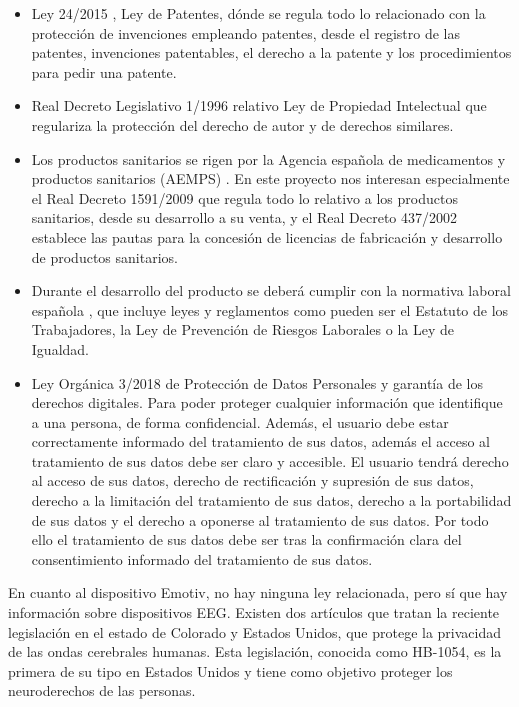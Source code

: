 \begin{itemize}
    \item Ley 24/2015 \cite{LeyPatentes}, Ley de Patentes, dónde se regula todo lo relacionado con la protección de invenciones empleando patentes, desde el registro de las patentes, invenciones patentables, el derecho a la patente y los procedimientos para pedir una patente.
    \item Real Decreto Legislativo 1/1996 \cite{LeyPropiedadIntelectual} relativo Ley de Propiedad Intelectual que regulariza la protección del derecho de autor y de derechos similares.
    \item Los productos sanitarios se rigen por la Agencia española de medicamentos y productos sanitarios (AEMPS) \cite{LegislacionProductosSanitarios}. En este proyecto nos interesan especialmente el Real Decreto 1591/2009 \cite{LeyProductosSanitarios} que regula todo lo relativo a los productos sanitarios, desde su desarrollo a su venta, y el Real Decreto 437/2002\cite{LeyLicenciasFuncionamiento} establece las pautas para la concesión de licencias de fabricación y desarrollo de productos sanitarios.
    \item Durante el desarrollo del producto se deberá cumplir con la normativa laboral española \cite{LeyesLaborales}, que incluye leyes y reglamentos como pueden ser el Estatuto de los Trabajadores, la Ley de Prevención de Riesgos Laborales o la Ley de Igualdad.
    \item Ley Orgánica 3/2018 \cite{LeyProteccionDatos} de Protección de Datos Personales y garantía de los derechos digitales. Para poder proteger cualquier información que identifique a una persona, de forma confidencial. Además, el usuario debe estar correctamente informado del tratamiento de sus datos, además el acceso al tratamiento de sus datos debe ser claro y accesible. El usuario tendrá derecho al acceso de sus datos, derecho de rectificación y supresión de sus datos, derecho a la limitación del tratamiento de sus datos, derecho a la portabilidad de sus datos y el derecho a oponerse al tratamiento de sus datos. Por todo ello el tratamiento de sus datos debe ser tras la confirmación clara del consentimiento informado del tratamiento de sus datos.
\end{itemize}

En cuanto al dispositivo Emotiv, no hay ninguna ley relacionada, pero sí que hay información sobre dispositivos EEG. Existen dos artículos que tratan la reciente legislación en el estado de Colorado y Estados Unidos, que protege la privacidad de las ondas cerebrales humanas. Esta legislación, conocida como HB-1054, es la primera de su tipo en Estados Unidos y tiene como objetivo proteger los neuroderechos de las personas.

